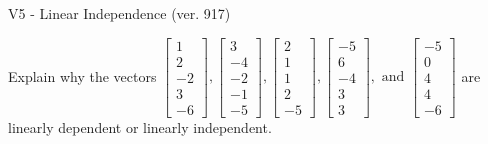 \begin{exercise}
  \begin{exerciseTitle}V5 - Linear Independence (ver. 917)\end{exerciseTitle}
  \begin{exerciseStatement}
    Explain why the vectors \(\left[\begin{array}{r}
1 \\
2 \\
-2 \\
3 \\
-6
\end{array}\right] , \left[\begin{array}{r}
3 \\
-4 \\
-2 \\
-1 \\
-5
\end{array}\right] , \left[\begin{array}{r}
2 \\
1 \\
1 \\
2 \\
-5
\end{array}\right] , \left[\begin{array}{r}
-5 \\
6 \\
-4 \\
3 \\
3
\end{array}\right] , \text{ and } \left[\begin{array}{r}
-5 \\
0 \\
4 \\
4 \\
-6
\end{array}\right]\) are linearly dependent or linearly independent.	



\end{exerciseStatement}
\end{exercise}
